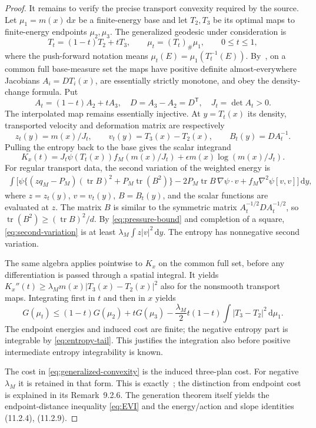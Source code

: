 \documentclass[11pt]{article}
\numberwithin{equation}{section}
\theoremstyle{definition}
\theoremstyle{remark}
\newcommand{\dd}{\,\mathrm d}
\begin{document}
\begin{proof}
It remains to verify the precise transport convexity required by the source.
Let $\mu_1=m(x)\dd x$ be a finite-energy base and let $T_2,T_3$ be its
optimal maps to finite-energy endpoints $\mu_2,\mu_3$. The generalized
geodesic under consideration is
\[
 T_t=(1-t)T_2+tT_3,\qquad \mu_t=(T_t)_\#\mu_1,\qquad0\le t\le1,
\]
where the push-forward notation means $\mu_t(E)=\mu_1(T_t^{-1}(E))$.
By~\cite[Lemma~5.5.3 and Proposition~6.2.12]{AGS}, on a common full
base-measure set the maps have positive definite almost-everywhere
Jacobians $A_i=DT_i(x)$, are essentially strictly monotone, and obey the
density-change formula. Put
\[
 A_t=(1-t)A_2+tA_3,\quad D=A_3-A_2=D^{\mathsf T},\quad
 J_t=\det A_t>0.
\]
The interpolated map remains essentially injective. At $y=T_t(x)$ its
density, transported velocity and deformation matrix are respectively
\[
 z_t(y)=m(x)/J_t,\qquad v_t(y)=T_3(x)-T_2(x),\qquad B_t(y)=DA_t^{-1}.
\]
Pulling the entropy back to the base gives the scalar integrand
\[
 K_x(t)=J_t\psi(T_t(x))f_M(m(x)/J_t)
                       +\epsilon m(x)\log(m(x)/J_t).
\]
For regular transport data, the second variation of the weighted energy is
\begin{align}\label{eq:second-variation}
 \int\bigl[\psi\{(zq_M-P_M)(\operatorname{tr}B)^2
                +P_M\operatorname{tr}(B^2)\}
  -2P_M\operatorname{tr}B\,\nabla\psi\cdot v
             +f_M\nabla^2\psi[v,v]\bigr]\dd y,
\end{align}
where $z=z_t(y)$, $v=v_t(y)$, $B=B_t(y)$, and the scalar functions are
evaluated at $z$. The matrix $B$ is similar to the symmetric matrix
$A_t^{-1/2}DA_t^{-1/2}$, so
$\operatorname{tr}(B^2)\ge(\operatorname{tr}B)^2/d$.
By \eqref{eq:pressure-bound} and completion of a square,
\eqref{eq:second-variation} is at least $\lambda_M\int z|v|^2\dd y$.
The entropy has nonnegative second variation.

The same algebra applies pointwise to $K_x$ on the common full set,
before any differentiation is passed through a spatial integral.
It yields $K_x''(t)\ge\lambda_Mm(x)|T_3(x)-T_2(x)|^2$ also for the
nonsmooth transport maps. Integrating first in $t$ and then in $x$ yields
\begin{equation}\label{eq:generalized-convexity}
 G(\mu_t)\le(1-t)G(\mu_2)+tG(\mu_3)
 -\frac{\lambda_M}{2}t(1-t)
         \int|T_3-T_2|^2\dd\mu_1.
\end{equation}
The endpoint energies and induced cost are finite; the negative entropy
part is integrable by \eqref{eq:entropy-tail}. This justifies the integration
also before positive intermediate entropy integrability is known.

The cost in \eqref{eq:generalized-convexity} is the induced three-plan cost.
For negative $\lambda_M$ it is retained in that form.
This is exactly~\cite[Definition~9.2.4 and (11.2.1a)]{AGS}; the distinction
from endpoint cost is explained in its Remark~9.2.6. The generation theorem
itself yields the endpoint-distance inequality \eqref{eq:EVI} and the
energy/action and slope identities (11.2.4), (11.2.9).
\end{proof}
\end{document}
